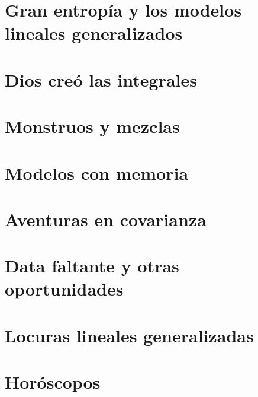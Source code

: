 \documentclass[a4paper,10pt]{book}
\begin{document}
\chapter{Gran entropía y los modelos lineales generalizados}

\chapter{Dios creó las integrales}

\chapter{Monstruos y mezclas}

\chapter{Modelos con memoria}

\chapter{Aventuras en covarianza}

\chapter{Data faltante y otras oportunidades}

\chapter{Locuras lineales generalizadas}

\chapter{Horóscopos}
\end{document}

